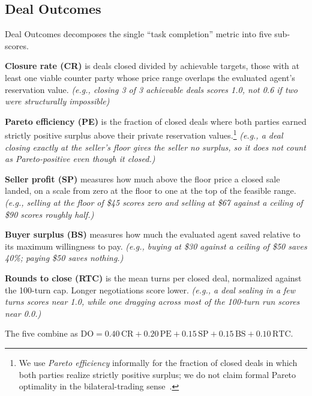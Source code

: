 \documentclass{article} %
\newcommand{\eg}[1]{\textit{\small(e.g., #1)}}
\begin{document}
\subsection{Deal Outcomes}
Deal Outcomes decomposes the single ``task completion'' metric into five sub-scores.

\textbf{Closure rate (CR)} is deals closed divided by achievable targets, those with at least one viable counter party whose price range overlaps the evaluated agent's reservation value. \eg{closing 3 of 3 achievable deals scores 1.0, not 0.6 if two were structurally impossible}

\textbf{Pareto efficiency (PE)} is the fraction of closed deals where both parties earned strictly positive surplus above their private reservation values.\footnote{We use \emph{Pareto efficiency} informally for the fraction of closed deals in which both parties realize strictly positive surplus; we do not claim formal Pareto optimality in the bilateral-trading sense~\citep{myerson1983efficient}.} \eg{a deal closing exactly at the seller's floor gives the seller no surplus, so it does not count as Pareto-positive even though it closed.}

\textbf{Seller profit (SP)} measures how much above the floor price a closed sale landed, on a scale from zero at the floor to one at the top of the feasible range. \eg{selling at the floor of \$45 scores zero and selling at \$67 against a ceiling of \$90 scores roughly half.}

\textbf{Buyer surplus (BS)} measures how much the evaluated agent saved relative to its maximum willingness to pay. \eg{buying at \$30 against a ceiling of \$50 saves 40\%; paying \$50 saves nothing.}

\textbf{Rounds to close (RTC)} is the mean turns per closed deal, normalized against the 100-turn cap. Longer negotiations score lower. \eg{a deal sealing in a few turns scores near 1.0, while one dragging across most of the 100-turn run scores near 0.0.}

The five combine as $\mathrm{DO} = 0.40\,\mathrm{CR} + 0.20\,\mathrm{PE} + 0.15\,\mathrm{SP} + 0.15\,\mathrm{BS} + 0.10\,\mathrm{RTC}$.
\end{document}
